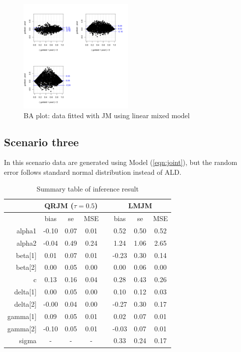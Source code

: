 \documentclass{article}
\begin{document}
\begin{figure}[H]
\centering
\includegraphics[width=0.5\textwidth]{ba_qt50data_meanfit.pdf}
\caption{BA plot: data fitted with JM using linear mixed model}
\end{figure}




\subsection{Scenario three}
In this scenario data are generated using Model (\ref{eqn:joint}), but the random error follows standard normal distribution instead of ALD.



\begin{table}[H]
\centering
\caption{Summary table of inference result}
\begin{tabular}{rccccccc}
\hline
& \multicolumn{3}{c}{QRJM ($\tau=0.5$)} & & \multicolumn{3}{c}{LMJM}\\
\hline
 & bias & se & MSE & & bias & se & MSE \\
 \cline{2-4}  \cline{6-8}
alpha1 & -0.10 & 0.07 & 0.01 & & 0.52 & 0.50 & 0.52 \\
  alpha2 & -0.04 & 0.49 & 0.24 & & 1.24 & 1.06 & 2.65 \\
  beta[1] & 0.01 & 0.07 & 0.01 & & -0.23 & 0.30 & 0.14 \\
  beta[2] & 0.00 & 0.05 & 0.00 & & 0.00 & 0.06 & 0.00 \\
  c & 0.13 & 0.16 & 0.04 & & 0.28 & 0.43 & 0.26 \\
  delta[1] & 0.00 & 0.05 & 0.00 & & 0.10 & 0.12 & 0.03 \\
  delta[2] & -0.00 & 0.04 & 0.00 & & -0.27 & 0.30 & 0.17 \\
  gamma[1] & 0.09 & 0.05 & 0.01 & & 0.02 & 0.07 & 0.01 \\
  gamma[2] & -0.10 & 0.05 & 0.01 & &  -0.03 & 0.07 & 0.01 \\
  sigma & - & - & - & & 0.33 & 0.24 & 0.17 \\
   \hline
\end{tabular}
\end{table}
\end{document}
